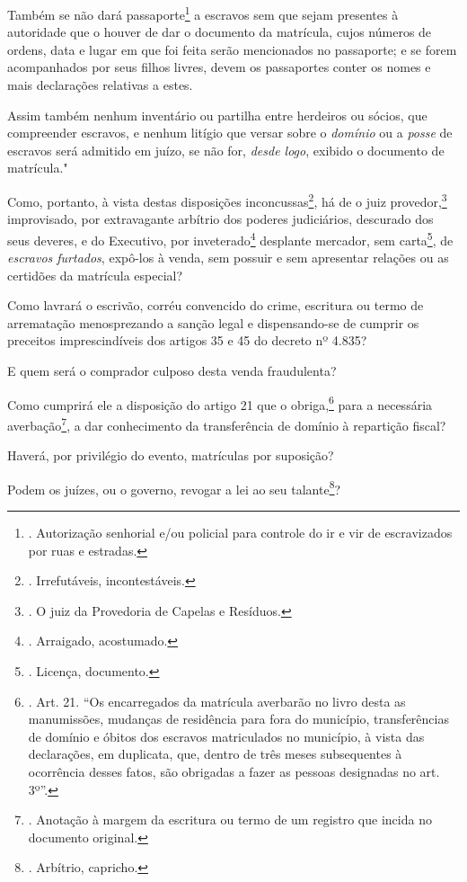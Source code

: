 Também se não dará passaporte\footnote{. Autorização senhorial e/ou
  policial para controle do ir e vir de escravizados por ruas e
  estradas.} a escravos sem que sejam presentes à autoridade que o
houver de dar o documento da matrícula, cujos números de ordens, data e
lugar em que foi feita serão mencionados no passaporte; e se forem
acompanhados por seus filhos livres, devem os passaportes conter os
nomes e mais declarações relativas a estes.

Assim também nenhum inventário ou partilha entre herdeiros ou sócios,
que compreender escravos, e nenhum litígio que versar sobre o
\emph{domínio} ou a \emph{posse} de escravos será admitido em juízo, se
não for, \emph{desde logo}, exibido o documento de matrícula."

Como, portanto, à vista destas disposições inconcussas\footnote{.
  Irrefutáveis, incontestáveis.}, há de o juiz provedor,\footnote{. O
  juiz da Provedoria de Capelas e Resíduos.} improvisado, por
extravagante arbítrio dos poderes judiciários, descurado dos seus
deveres, e do Executivo, por inveterado\footnote{. Arraigado,
  acostumado.} desplante mercador, sem carta\footnote{. Licença,
  documento.}, de \emph{escravos furtados}, expô-los à venda, sem
possuir e sem apresentar relações ou as certidões da matrícula especial?

Como lavrará o escrivão, corréu convencido do crime, escritura ou termo
de arrematação menosprezando a sanção legal e dispensando-se de cumprir
os preceitos imprescindíveis dos artigos 35 e 45 do decreto nº 4.835?

E quem será o comprador culposo desta venda fraudulenta?

Como cumprirá ele a disposição do artigo 21 que o obriga,\footnote{.
  Art. 21. ``Os encarregados da matrícula averbarão no livro desta as
  manumissões, mudanças de residência para fora do município,
  transferências de domínio e óbitos dos escravos matriculados no
  município, à vista das declarações, em duplicata, que, dentro de três
  meses subsequentes à ocorrência desses fatos, são obrigadas a fazer as
  pessoas designadas no art. 3º''.} para a necessária
averbação\footnote{. Anotação à margem da escritura ou termo de um
  registro que incida no documento original.}, a dar conhecimento da
transferência de domínio à repartição fiscal?

Haverá, por privilégio do evento, matrículas por suposição?

Podem os juízes, ou o governo, revogar a lei ao seu talante\footnote{.
  Arbítrio, capricho.}?

